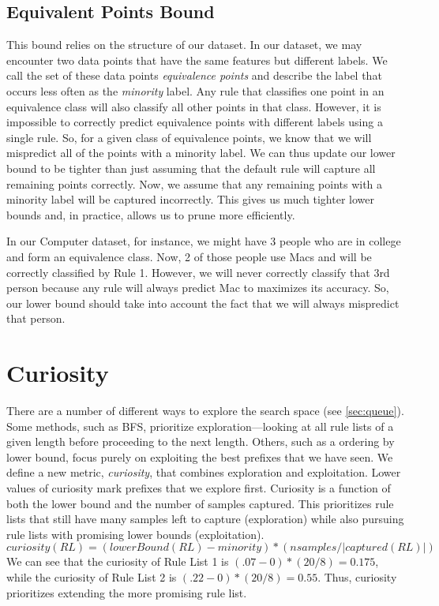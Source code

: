 \subsection{Equivalent Points Bound}
This bound relies on the structure of our dataset.
In our dataset, we may encounter two data points that have the same features but different labels.
We call the set of these data points \textit{equivalence points} and describe the label that occurs less often as the \textit{minority} label.
Any rule that classifies one point in an equivalence class will also classify all other points in that class.
However, it is impossible to correctly predict equivalence points with different labels using a single rule.
So, for a given class of equivalence points, we know that we will mispredict all of the points with a minority label.
We can thus update our lower bound to be tighter than just assuming that the default rule will capture all remaining points correctly.
Now, we assume that any remaining points with a minority label will be captured incorrectly.
This gives us much tighter lower bounds and, in practice, allows us to prune more efficiently.

In our Computer dataset, for instance, we might have 3 people who are in college and form an equivalence class.
Now, 2 of those people use Macs and will be correctly classified by Rule 1.
However, we will never correctly classify that 3rd person because any rule will always predict Mac to maximizes its accuracy.
So, our lower bound should take into account the fact that we will always mispredict that person.

\section{Curiosity}
\label{def:curiosity}
There are a number of different ways to explore the search space (see \ref{sec:queue}).
Some methods, such as BFS, prioritize exploration---looking at all rule lists of a given length before proceeding to the next length.
Others, such as a ordering by lower bound, focus purely on exploiting the best prefixes that we have seen.
We define a new metric, \textit{curiosity}, that combines exploration and exploitation.
Lower values of curiosity mark prefixes that we explore first.
Curiosity is a function of both the lower bound and the number of samples captured.
This prioritizes rule lists that still have many samples left to capture (exploration) while also pursuing rule lists with promising lower bounds (exploitation).
$$curiosity(RL) = (lowerBound(RL) - minority)  * (nsamples / |captured(RL)|)$$
We can see that the curiosity of Rule List 1 is $(.07 - 0) * (20 / 8) = 0.175$, while the curiosity of Rule List 2 is $(.22 - 0) * (20 / 8) = 0.55$.
Thus, curiosity prioritizes extending the more promising rule list.

